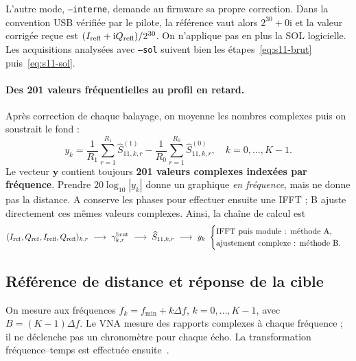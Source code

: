 \documentclass[11pt,a4paper]{article}
\newcommand{\ii}{\mathrm{i}}
\begin{document}
L'autre mode, \texttt{--interne}, demande au firmware sa propre correction.
Dans la convention USB vérifiée par le pilote, la référence vaut alors
$2^{30}+0\ii$ et la valeur corrigée reçue est
$(I_{\rm refl}+\ii Q_{\rm refl})/2^{30}$. On n'applique pas en plus la SOL
logicielle. Les acquisitions analysées avec \texttt{--sol} suivent bien
les étapes~\eqref{eq:s11-brut} puis~\eqref{eq:s11-sol}.

\paragraph{Des 201 valeurs fréquentielles au profil en retard.}
Après correction de chaque balayage, on moyenne les nombres complexes puis
on soustrait le fond :
\begin{equation}\label{eq:s11-vers-y}
 y_k=\frac1{R_1}\sum_{r=1}^{R_1}\widehat S^{(1)}_{11,k,r}
     -\frac1{R_0}\sum_{r=1}^{R_0}\widehat S^{(0)}_{11,k,r},
 \quad k=0,\ldots,K-1.
\end{equation}
Le vecteur $\mathbf y$ contient toujours \textbf{201 valeurs complexes indexées
par fréquence}. Prendre $20\log_{10}|y_k|$ donne un graphique \emph{en fréquence},
mais ne donne pas la distance. A conserve les phases pour effectuer ensuite
une IFFT ; B ajuste directement ces mêmes valeurs complexes.
Ainsi, la chaîne de calcul est
\begin{equation*}
 (I_{\rm ref},Q_{\rm ref},I_{\rm refl},Q_{\rm refl})_{k,r}
 \ \longrightarrow\ \gamma^{\rm brut}_{k,r}
 \ \longrightarrow\ \widehat S_{11,k,r}
 \ \longrightarrow\ y_k
 \ \begin{cases}
   \text{IFFT puis module : méthode A},\\
   \text{ajustement complexe : méthode B}.
 \end{cases}
\end{equation*}

\subsection{Référence de distance et réponse de la cible}

On mesure aux fréquences $f_k=f_{\min}+k\Delta f$, $k=0,\ldots,K-1$,
avec $B=(K-1)\Delta f$. Le VNA mesure des rapports complexes à chaque fréquence ;
il ne déclenche pas un chronomètre pour chaque écho. La transformation
fréquence--temps est effectuée ensuite~\cite{keysight}.
\end{document}
